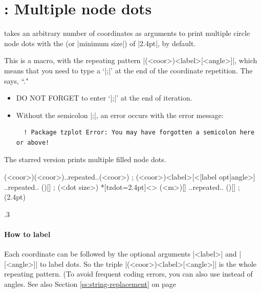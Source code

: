 \section{\protect\cmd{\tzdots(*)}: Multiple node dots}
\label{s:tzdots}

\icmd{\tzdots} takes an arbitrary number of coordinates as arguments to print multiple circle node dots with the  (or |minimum size|) of |2.4pt|, by default.

This is a  macro, with the repeating pattern |(<coor>){<label>}[<angle>]|, which means that you need to type a  `|;|' at the end of the coordinate repetition. The  says, ``."

\remark
\begin{itemize}\firmlist
\item DO NOT FORGET to enter `|;|' at the end of iteration.
\item Without the semicolon |;|, an error occurs with the error message:
  \begin{verbatim}
  ! Package tzplot Error: You may have forgotten a semicolon here or above!
  \end{verbatim}
\end{itemize}

The starred version \icmd{\tzdots*} prints multiple filled node dots.

\begin{tzdef}{}
\tzdots*(<coor>)(<coor>)..repeated..(<coor>) ;
 (<coor>){<label>}[<[label opt]angle>]
                                 ..repeated.. (){}[] ; (<dot size>)
 *[tzdot=2.4pt]<> (<m>){}[] ..repeated.. (){}[] ; (2.4pt)
\end{tzdef}

\begin{tzcode}{.3}
\end{tzcode}

\paragraph{How to label}

Each coordinate can be followed by the optional arguments |{<label>}| and |[<angle>]| to label dots. So the triple |(<coor>){<label>}[<angle>]| is the whole repeating pattern.
(To avoid frequent coding errors, you can also use  instead of angles. See also Section \ref{ss:string-replacement} on page \pageref{ss:string-replacement}

